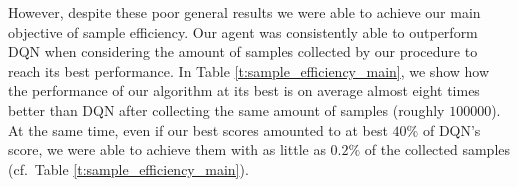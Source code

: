 However, despite these poor general results we were able to achieve our main
objective of sample efficiency.
Our agent was consistently able to outperform DQN when considering the amount of
samples collected by our procedure to reach its best performance. 
In Table \ref{t:sample_efficiency_main}, we show how the performance of our 
algorithm at its best is on average almost eight times better than DQN after 
collecting the same amount of samples (roughly $100000$).
At the same time, even if our best scores amounted to at best $40\%$ of DQN's 
score, we were able to achieve them with as little as $0.2\%$ of the collected 
samples (cf.\ Table \ref{t:sample_efficiency_main}).
    




